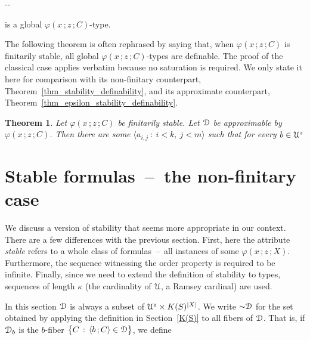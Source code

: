 \documentclass{amsproc}
\newcounter{thm}
\theoremstyle{mio}
\newtheorem{theorem}[thm]{Theorem}\tcolorboxenvironment{theorem}{mythm}
\begin{document}
  \noindent\kern-\kern-

is a global $\varphi(x\,;z\,;C)$-type.\smallskip

The following theorem is often rephrased by saying that, when $\varphi(x\,;z\,;C)$ is finitarily stable, all global $\varphi(x\,;z\,;C)$-types are definable.
The proof of the classical case applies verbatim because no saturation is required.
We only state it here for comparison with its non-finitary counterpart, Theorem~\ref{thm_stability_definability}, and its approximate counterpart, Theorem~\ref{thm_epsilon_stability_definability}.

\begin{theorem}
  Let $\varphi(x\,;z\,;C)$ be finitarily stable.
  Let ${\EuScript D}$ be approximable by $\varphi(x\,;z\,;C)$.
  Then there are some $\langle a_{i,j}\ :\ i< k,\ j<m\rangle$ such that for every $b\in{\EuScript U}^z$\medskip

\end{theorem}


\section{Stable formulas~--~the non-finitary case}\label{nonfinitary}
\def\medrel#1{\parbox{5ex}{\hfil $#1$}}
\def\ceq#1#2#3{\parbox[t]{22ex}{$\displaystyle #1$}\medrel{#2}{$\displaystyle #3$}}

We discuss a version of stability that seems more appropriate in our context.
There are a few differences with the previous section.
First, here the attribute \textit{stable\/} refers to a whole class of formulas~--~all instances of some $\varphi(x\,;z\,;X)$.
Furthermore, the sequence witnessing the order property is required to be infinite.
Finally, since we need to extend the definition of stability to types, sequences of length $\kappa$ (the cardinality of ${\EuScript U}$, a Ramsey cardinal) are used.

In this section  ${\EuScript D}$ is always a subset of ${\EuScript U}^z\times K(S)^{|X|}$.
We write ${\sim}{\EuScript D}$ for the set obtained by applying the definition in Section~\ref{K(S)} to all fibers of ${\EuScript D}$.
That is, if ${\EuScript D}_b$ is the $b$-fiber $\big\{C\,:\,\langle b\,;C\rangle\in{\EuScript D}\big\}$, we define
\end{document}
